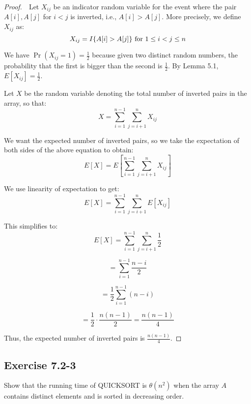 \documentclass{article}
\begin{document}
\begin{proof}
    $ $\newline
    $ $\newline
    Let $X_{ij}$ be an indicator random variable for the event where the pair $A[i], A[j]$ for $i < j$ is inverted, i.e., $A[i] > A[j]$. 
    More precisely, we define $X_{ij}$ as:
    \[ X_{ij} = I\{A[i] > A[j]\} \text{ for } 1 \leq i < j \leq n \\
    \]
    
    We have $\Pr(X_{ij} = 1) = \frac{1}{2}$ because given two distinct random numbers, the probability that the first is bigger than the second is $\frac{1}{2}$. 
    By Lemma 5.1, $E[X_{ij}] = \frac{1}{2}$.
    
    Let $X$ be the random variable denoting the total number of inverted pairs in the array, so that:
    \[ X = \sum_{i=1}^{n-1} \sum_{j=i+1}^{n} X_{ij}
    \]
    
    We want the expected number of inverted pairs, so we take the expectation of both sides of the above equation to obtain:
    \[ E[X] = E\left[ \sum_{i=1}^{n-1} \sum_{j=i+1}^{n} X_{ij} \right]
    \]
    
    We use linearity of expectation to get:
    \[ E[X] = \sum_{i=1}^{n-1} \sum_{j=i+1}^{n} E[X_{ij}]
    \]
    
    This simplifies to:
    \[ E[X] = \sum_{i=1}^{n-1} \sum_{j=i+1}^{n} \frac{1}{2}
    \]
    
    \[     = \sum_{i=1}^{n-1} \frac{n - i}{2}
    \]
    
    \[     = \frac{1}{2} \sum_{i=1}^{n-1} (n - i)
    \]
    
    \[     = \frac{1}{2} \cdot \frac{n(n-1)}{2} = \frac{n(n-1)}{4}
    \]
    
    Thus, the expected number of inverted pairs is $\frac{n(n-1)}{4}$.
\end{proof}

\subsection*{Exercise 7.2-3}
%
Show that the running time of QUICKSORT is $\theta (n^2)$ when the array $A$ contains distinct elements and is sorted in decreasing order.
\end{document}
